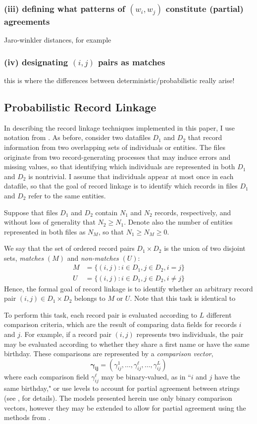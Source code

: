 \documentclass[12pt]{article}
\begin{document}
\subsubsection*{(iii) defining what patterns of $(w_i,w_j)$ constitute (partial) agreements}
Jaro-winkler distances, for example  

\subsubsection{(iv) designating $(i,j)$ pairs as matches}
this is where the differences between deterministic/probabilistic really arise! 

\subsection{Probabilistic Record Linkage}
In describing the record linkage techniques implemented in this paper, I use notation from \cite{fellegi69}.  As before, consider two datafiles $D_1$ and $D_2$ that record information from two overlapping sets of individuals or entities.  The files originate from two record-generating processes that may induce errors and missing values, so that identifying which individuals are represented in both $D_1$ and $D_2$ is nontrivial.  I assume that individuals appear at most once in each datafile, so that the goal of record linkage is to identify which records in files $D_1$ and $D_2$ refer to the same entities.

Suppose that files $D_1$ and $D_2$ contain $N_1$ and $N_2$ records, respectively, and without loss of generality that $N_2 \geq N_1$.  Denote also the number of entities represented in both files as $N_{M}$, so that $N_1 \geq N_M \geq 0$. 

We say that the set of ordered record pairs $D_1 \times D_2$ is the union of two disjoint sets, \textit{matches} $(M)$ and \textit{non-matches} $(U)$:
\begin{align*} M &= \{(i,j): i\in D_1, j\in D_2, i=j\} \\ U &= \{(i,j): i\in D_1, j\in D_2, i\neq j\}\end{align*} 
Hence, the formal goal of record linkage is to identify whether an arbitrary record pair $(i,j)\in D_1\times D_2$ belongs to $M$ or $U$.   Note that this task is identical to 

To perform this task, each record pair is evaluated according to $L$ different comparison criteria, which are the result of comparing data fields for records $i$ and $j$.  For example, if a record pair $(i,j)$ represents two individuals, the pair may be evaluated according to whether they share a first name or have the same birthday.  These comparisons are represented by a \textit{comparison vector}, $$\mathbf{\gamma_{ij}}= (\gamma_{ij}^1, \dots, \gamma_{ij}^{\ell}, \dots, \gamma_{ij}^L)$$  where each comparison field $\gamma_{ij}^{\ell}$ may be binary-valued, as in ``$i$ and $j$ have the same birthday," or use levels to account for partial agreement between strings (see \citealp{winkler90}, for details).  The models presented herein use only binary comparison vectors, however they may be extended to allow for partial agreement using the methods from \cite{sadinle_2017}.
\end{document}
